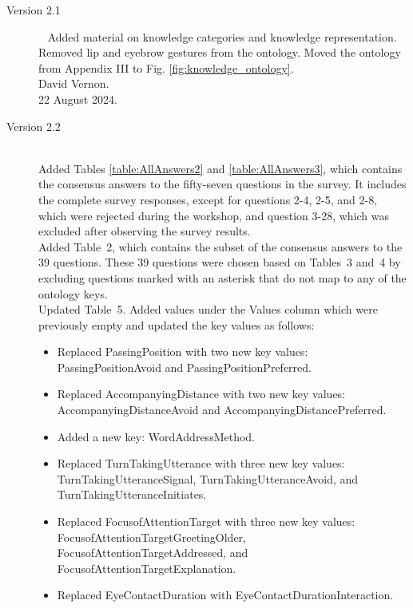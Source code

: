 \documentclass{CSSRforAfrica}
\begin{document}
\begin{description}
\item [Version 2.1]~
Added material on knowledge categories and knowledge representation. Removed lip and eyebrow gestures from  the ontology.  Moved the ontology from Appendix III to Fig. \ref{fig:knowledge_ontology}. \\        
David Vernon.\\               
22 August 2024.  

\item [Version 2.2]~ \\
Added Tables \ref{table:AllAnswers2} and \ref{table:AllAnswers3}, which contains the consensus answers to the fifty-seven questions in the survey. It includes the complete survey responses, except for questions 2-4, 2-5, and 2-8, which were rejected during the workshop, and question 3-28, which was excluded after observing the survey results. \\

Added Table~2, which contains the subset of the consensus answers to the 39 questions. These 39 questions were chosen based on Tables~3 and~4 by excluding questions marked with an asterisk that do not map to any of the ontology keys.\\

Updated Table~5. Added values under the Values column which were previously empty and updated the key values as follows:
\begin{itemize}
    \item Replaced PassingPosition with two new key values: PassingPositionAvoid and PassingPositionPreferred.
    
    \item Replaced AccompanyingDistance with two new key values: AccompanyingDistanceAvoid and AccompanyingDistancePreferred.
    
    \item Added a new key: WordAddressMethod.
    
    \item Replaced TurnTakingUtterance with three new key values: TurnTakingUtteranceSignal, TurnTakingUtteranceAvoid, and TurnTakingUtteranceInitiates.
    
    \item Replaced FocusofAttentionTarget with three new key values: FocusofAttentionTargetGreetingOlder, FocusofAttentionTargetAddressed, and FocusofAttentionTargetExplanation.

    \item Replaced EyeContactDuration with EyeContactDurationInteraction.
    

\end{itemize}
\end{description}
\end{document}
